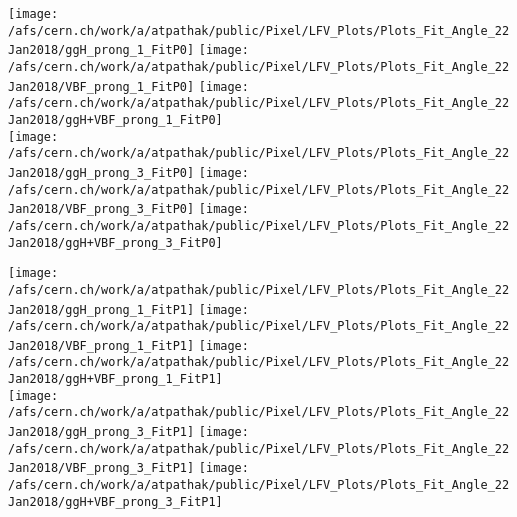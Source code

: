 \documentclass{beamer}
\begin{document}
\begin{frame}
\begin{normalsize}
\begin{center}
\texttt{[image: /afs/cern.ch/work/a/atpathak/public/Pixel/LFV\_Plots/Plots\_Fit\_Angle\_22Jan2018/ggH\_prong\_1\_FitP0]}
\texttt{[image: /afs/cern.ch/work/a/atpathak/public/Pixel/LFV\_Plots/Plots\_Fit\_Angle\_22Jan2018/VBF\_prong\_1\_FitP0]}
\texttt{[image: /afs/cern.ch/work/a/atpathak/public/Pixel/LFV\_Plots/Plots\_Fit\_Angle\_22Jan2018/ggH+VBF\_prong\_1\_FitP0]}\\
\texttt{[image: /afs/cern.ch/work/a/atpathak/public/Pixel/LFV\_Plots/Plots\_Fit\_Angle\_22Jan2018/ggH\_prong\_3\_FitP0]}
\texttt{[image: /afs/cern.ch/work/a/atpathak/public/Pixel/LFV\_Plots/Plots\_Fit\_Angle\_22Jan2018/VBF\_prong\_3\_FitP0]}
\texttt{[image: /afs/cern.ch/work/a/atpathak/public/Pixel/LFV\_Plots/Plots\_Fit\_Angle\_22Jan2018/ggH+VBF\_prong\_3\_FitP0]}
\end{center}
\end{normalsize}
\end {frame}
\begin{frame}
\begin{normalsize}
\begin{center}
\texttt{[image: /afs/cern.ch/work/a/atpathak/public/Pixel/LFV\_Plots/Plots\_Fit\_Angle\_22Jan2018/ggH\_prong\_1\_FitP1]}
\texttt{[image: /afs/cern.ch/work/a/atpathak/public/Pixel/LFV\_Plots/Plots\_Fit\_Angle\_22Jan2018/VBF\_prong\_1\_FitP1]}
\texttt{[image: /afs/cern.ch/work/a/atpathak/public/Pixel/LFV\_Plots/Plots\_Fit\_Angle\_22Jan2018/ggH+VBF\_prong\_1\_FitP1]}\\
\texttt{[image: /afs/cern.ch/work/a/atpathak/public/Pixel/LFV\_Plots/Plots\_Fit\_Angle\_22Jan2018/ggH\_prong\_3\_FitP1]}
\texttt{[image: /afs/cern.ch/work/a/atpathak/public/Pixel/LFV\_Plots/Plots\_Fit\_Angle\_22Jan2018/VBF\_prong\_3\_FitP1]}
\texttt{[image: /afs/cern.ch/work/a/atpathak/public/Pixel/LFV\_Plots/Plots\_Fit\_Angle\_22Jan2018/ggH+VBF\_prong\_3\_FitP1]}
\end{center}
\end{normalsize}
\end {frame}
\end{document}
